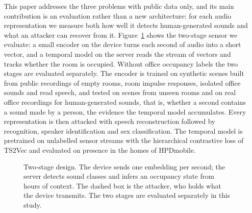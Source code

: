 \documentclass[11pt]{article}
\begin{document}
This paper addresses the three problems with public data only, and its main contribution is an evaluation rather than a new architecture: for each audio representation we measure both how well it detects human-generated sounds and what an attacker can recover from it. Figure~\ref{fig:overview} shows the two-stage sensor we evaluate: a small encoder on the device turns each second of audio into a short vector, and a temporal model on the server reads the stream of vectors and tracks whether the room is occupied. Without office occupancy labels the two stages are evaluated separately. The encoder is trained on synthetic scenes built from public recordings of empty rooms, room impulse responses, isolated office sounds and read speech, and tested on scenes from unseen rooms and on real office recordings for human-generated sounds, that is, whether a second contains a sound made by a person, the evidence the temporal model accumulates. Every representation is then attacked with speech reconstruction followed by recognition, speaker identification and sex classification. The temporal model is pretrained on unlabelled sensor streams with the hierarchical contrastive loss of TS2Vec \citep{yue2022ts2vec} and evaluated on presence in the homes of HPDmobile.

\begin{figure}[t]
\centering
{}
\caption{Two-stage design. The device sends one embedding per second; the server detects sound classes and infers an occupancy state from hours of context. The dashed box is the attacker, who holds what the device transmits. The two stages are evaluated separately in this study.}
\label{fig:overview}
\end{figure}
\end{document}
